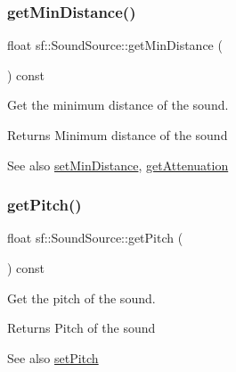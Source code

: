 \subsubsection{\texorpdfstring{getMinDistance()}{getMinDistance()}}
{\footnotesize\ttfamily float sf\+::\+Sound\+Source\+::get\+Min\+Distance (\begin{DoxyParamCaption}{ }\end{DoxyParamCaption}) const}



Get the minimum distance of the sound. 

\begin{DoxyReturn}{Returns}
Minimum distance of the sound
\end{DoxyReturn}
\begin{DoxySeeAlso}{See also}
\mbox{\hyperlink{classsf_1_1_sound_source_a75bbc2c34addc8b25a14edb908508afe}{set\+Min\+Distance}}, \mbox{\hyperlink{classsf_1_1_sound_source_a8ad7dafb4f1b4afbc638cebe24f48cc9}{get\+Attenuation}} \begin{DoxyVerb}\end{DoxyVerb}
 
\end{DoxySeeAlso}
\mbox{\label{classsf_1_1_sound_source_a4736acc2c802f927544c9ce52a44a9e4}} 
\subsubsection{\texorpdfstring{getPitch()}{getPitch()}}
{\footnotesize\ttfamily float sf\+::\+Sound\+Source\+::get\+Pitch (\begin{DoxyParamCaption}{ }\end{DoxyParamCaption}) const}



Get the pitch of the sound. 

\begin{DoxyReturn}{Returns}
Pitch of the sound
\end{DoxyReturn}
\begin{DoxySeeAlso}{See also}
\mbox{\hyperlink{classsf_1_1_sound_source_a72a13695ed48b7f7b55e7cd4431f4bb6}{set\+Pitch}} \begin{DoxyVerb}\end{DoxyVerb}
 
\end{DoxySeeAlso}
\mbox{\label{classsf_1_1_sound_source_a8d199521f55550c7a3b2b0f6950dffa1}} 
